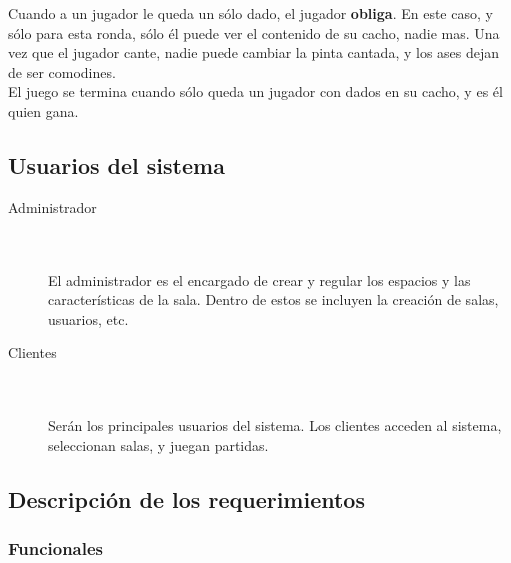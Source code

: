 \documentclass[a4paper,11pt]{article}
\begin{document}
	Cuando a un jugador le queda un sólo dado, el jugador \textbf{obliga}.
En este caso, y sólo para esta ronda, sólo él puede ver el contenido de su 
cacho, nadie mas. Una vez que el jugador cante, nadie puede cambiar la pinta
cantada, y los ases dejan de ser comodines.\\

	El juego se termina cuando sólo queda un jugador con dados en su cacho,
y es él quien gana.\\


\subsection{Usuarios del sistema}

\begin{description}
	\item[Administrador] \hfill \\ \\
	El administrador es el encargado de crear y 
	regular los espacios y las características de la sala. Dentro de estos
	se incluyen la creación de salas, usuarios, etc.

	\item[Clientes] \hfill \\ \\
	Serán los principales usuarios del sistema. Los 
	clientes acceden al sistema, seleccionan salas, y juegan partidas.
\end{description}
\newpage	

\subsection{Descripción de los requerimientos}
\subsubsection{Funcionales}
\end{document}
